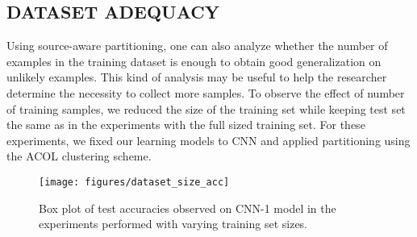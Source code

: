 \documentclass[letterpaper]{article}
\begin{document}
\subsection{DATASET ADEQUACY}

Using source-aware partitioning, one can also analyze whether the number of examples in the training dataset is enough to obtain good generalization on unlikely examples. This kind of analysis may be useful to help the researcher determine the necessity to collect more samples. To observe the effect of number of training samples, we reduced the size of the training set while keeping test set the same as in the experiments with the full sized training set. For these experiments, we fixed our learning models to CNN and applied partitioning using the ACOL clustering scheme. 

\begin{figure}[t]
	\begin{center}
		\centerline{\texttt{[image: figures/dataset\_size\_acc]}}
		\caption{Box plot of test accuracies observed on CNN-1 model in the experiments performed with varying training set sizes.}
		\label{fig:data_acc_box}
	\end{center}
	\vskip -0.2in
\end{figure}
\end{document}
